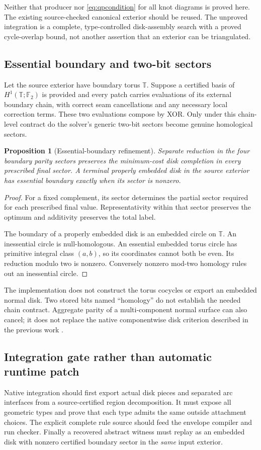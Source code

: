 \documentclass[11pt,a4paper]{article}
\newtheorem{proposition}[theorem]{Proposition}
\theoremstyle{definition}
\theoremstyle{remark}
\newcommand{\F}{\mathbb F_2}
\begin{document}
Neither that producer nor \eqref{eq:qpcondition} for all knot diagrams is proved here.
The existing source-checked canonical exterior should be reused. The unproved integration
is a complete, type-controlled disk-assembly search with a proved cycle-overlap bound,
not another assertion that an exterior can be triangulated.

\subsection{Essential boundary and two-bit sectors}
Let the source exterior have boundary torus $\mathbb T$. Suppose a certified basis of
$H^1(\mathbb T;\F)$ is provided and every patch carries evaluations of its external
boundary chain, with correct seam cancellations and any necessary local correction terms.
These two evaluations compose by XOR. Only under this chain-level contract do the
solver's generic two-bit sectors become genuine homological sectors.

\begin{proposition}[Essential-boundary refinement]\label{prop:essential}
Separate reduction in the four boundary parity sectors preserves the minimum-cost disk
completion in every prescribed final sector. A terminal properly embedded disk in the
source exterior has essential boundary exactly when its sector is nonzero.
\end{proposition}
\begin{proof}
For a fixed complement, its sector determines the partial sector required for each
prescribed final value. Representativity within that sector preserves the optimum and
additivity preserves the total label.

The boundary of a properly embedded disk is an embedded circle on $\mathbb T$.
An inessential circle is null-homologous. An essential embedded torus circle has primitive
integral class $(a,b)$, so its coordinates cannot both be even. Its reduction modulo two
is nonzero. Conversely nonzero mod-two homology rules out an inessential circle.
\end{proof}

The implementation does not construct the torus cocycles or export an embedded normal
disk. Two stored bits named ``homology'' do not establish the needed chain contract.
Aggregate parity of a multi-component normal surface can also cancel; it does not replace
the native componentwise disk criterion described in the previous work \cite{kernels}.

\subsection{Integration gate rather than automatic runtime patch}
Native integration should first export actual disk pieces and separated arc interfaces
from a source-certified region decomposition. It must expose all geometric types and
prove that each type admits the same outside attachment choices. The explicit complete
rule source should feed the envelope compiler and run checker. Finally a recovered
abstract witness must replay as an embedded disk with nonzero certified boundary sector
in the \emph{same} input exterior.
\end{document}
